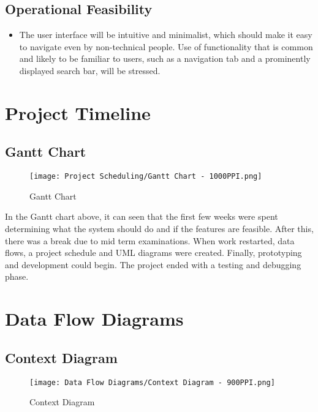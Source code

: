 \documentclass{scrreprt}
\begin{document}
    \section{Operational Feasibility}
        \begin{itemize}
            \item The user interface will be intuitive and minimalist, which should make it easy to navigate even by non-technical people. Use of functionality that is common and likely to be familiar to users, such as a navigation tab and a prominently displayed search bar, will be stressed.
        \end{itemize}


\chapter{Project Timeline}

    \section{Gantt Chart}
        \begin{figure}[!h]
            \centering
            \texttt{[image: Project Scheduling/Gantt Chart - 1000PPI.png]}
            {\caption*{Gantt Chart}}
        \end{figure}
        
        In the Gantt chart above, it can seen that the first few weeks were spent determining what the system should do and if the features are feasible. After this, there was a break due to mid term examinations. When work restarted, data flows, a project schedule and UML diagrams were created. Finally, prototyping and development could begin. The project ended with a testing and debugging phase.


\chapter{Data Flow Diagrams}
    
    \section{Context Diagram}
        \begin{figure}[!h]
            \centering
            \texttt{[image: Data Flow Diagrams/Context Diagram - 900PPI.png]}
            {\caption*{Context Diagram}}
        \end{figure}
        
\end{document}
